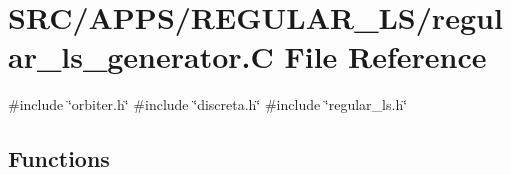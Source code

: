 \hypertarget{regular__ls__generator_8_c}{}\section{S\+R\+C/\+A\+P\+P\+S/\+R\+E\+G\+U\+L\+A\+R\+\_\+\+L\+S/regular\+\_\+ls\+\_\+generator.C File Reference}
\label{regular__ls__generator_8_c}
{\ttfamily \#include \char`\"{}orbiter.\+h\char`\"{}}\newline
{\ttfamily \#include \char`\"{}discreta.\+h\char`\"{}}\newline
{\ttfamily \#include \char`\"{}regular\+\_\+ls.\+h\char`\"{}}\newline
\subsection*{Functions}
